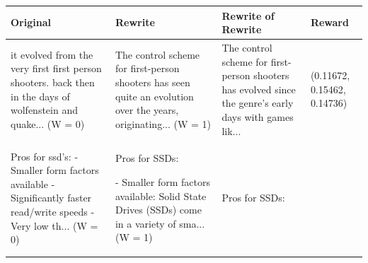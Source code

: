 \documentclass{article}
\begin{document}
\begin{table}[H]
  \centering
  \small
  \begin{tabular}{|p{}|p{}|p{}|p{}|}\hline
  Original & Rewrite & Rewrite of Rewrite & Reward \\ \hline
  it evolved from the very first first person shooters. back then in the days of wolfenstein and quake... (W = 0) & The control scheme for first-person shooters has seen quite an evolution over the years, originating... (W = 1) & The control scheme for first-person shooters has evolved since the genre's early days with games lik... & (0.11672, 0.15462, 0.14736) \\ \hline
  Pros for ssd's: -Smaller form factors available -Significantly faster read/write speeds -Very low th... (W = 0) & Pros for SSDs:

  - Smaller form factors available: Solid State Drives (SSDs) come in a variety of sma... (W = 1) & Pros for SSDs:


\end{tabular}
\end{table}
\end{document}

